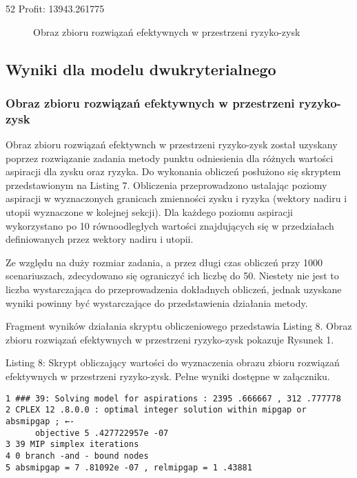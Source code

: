 \documentclass{article}
\begin{document}
52 Profit: 13943.261775

\begin{figure}[H]
\centering
\caption{Obraz zbioru rozwiązań efektywnych w przestrzeni ryzyko-zysk}
\label{fig:solutions}
\end{figure}

\subsection{Wyniki dla modelu dwukryterialnego}

\subsubsection{Obraz zbioru rozwiązań efektywnych w przestrzeni ryzyko-zysk}

Obraz zbioru rozwiązań efektywnch w przestrzeni ryzyko-zysk został uzyskany poprzez rozwiązanie zadania metody punktu odniesienia dla różnych wartości aspiracji dla zysku oraz ryzyka. Do wykonania obliczeń posłużono się skryptem przedstawionym na Listing 7. Obliczenia przeprowadzono ustalając poziomy aspiracji w wyznaczonych granicach zmienności zysku i ryzyka (wektory nadiru i utopii wyznaczone w kolejnej sekcji). Dla każdego poziomu aspiracji wykorzystano po 10 równoodległych wartości znajdujących się w przedziałach definiowanych przez wektory nadiru i utopii.

Ze względu na duży rozmiar zadania, a przez długi czas obliczeń przy 1000 scenariuszach, zdecydowano się ograniczyć ich liczbę do 50. Niestety nie jest to liczba wystarczająca do przeprowadzenia dokładnych obliczeń, jednak uzyskane wyniki powinny być wystarczające do przedstawienia działania metody.

Fragment wyników działania skryptu obliczeniowego przedstawia Listing 8. Obraz zbioru rozwiązań efektywnych w przestrzeni ryzyko-zysk pokazuje Rysunek 1.

Listing 8: Skrypt obliczający wartości do wyznaczenia obrazu zbioru rozwiązań efektywnych w przestrzeni ryzyko-zysk. Pełne wyniki dostępne w załączniku.

\begin{verbatim}
1 ### 39: Solving model for aspirations : 2395 .666667 , 312 .777778
2 CPLEX 12 .8.0.0 : optimal integer solution within mipgap or absmipgap ; ←-
      objective 5 .427722957e -07
3 39 MIP simplex iterations
4 0 branch -and - bound nodes
5 absmipgap = 7 .81092e -07 , relmipgap = 1 .43881
\end{verbatim}
\end{document}

